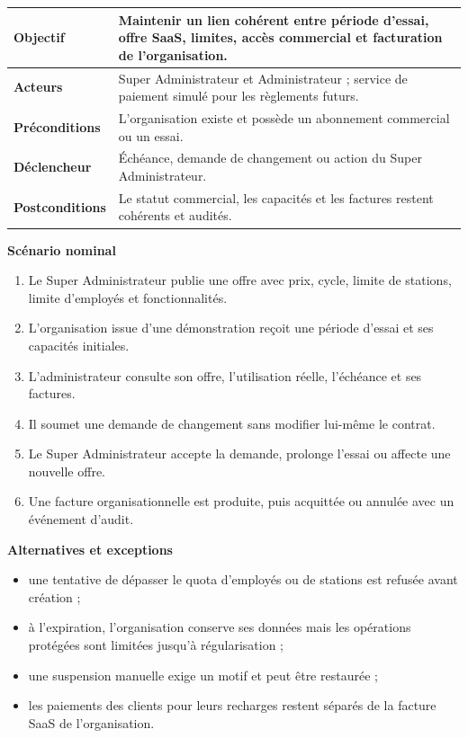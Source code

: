 \begin{table}[H]
  \centering
  \begin{tabularx}{\textwidth}{|C{3.3cm}|Y|}
    \hline
    \textbf{Objectif} & Maintenir un lien cohérent entre période d'essai, offre SaaS,
    limites, accès commercial et facturation de l'organisation.\\\hline
    \textbf{Acteurs} & Super Administrateur et Administrateur ; service de paiement
    simulé pour les règlements futurs.\\\hline
    \textbf{Préconditions} & L'organisation existe et possède un abonnement
    commercial ou un essai.\\\hline
    \textbf{Déclencheur} & Échéance, demande de changement ou action du Super
    Administrateur.\\\hline
    \textbf{Postconditions} & Le statut commercial, les capacités et les factures
    restent cohérents et audités.\\\hline

  \end{tabularx}
\end{table}

\textbf{Scénario nominal}
\begin{enumerate}[leftmargin=8mm]
  \item Le Super Administrateur publie une offre avec prix, cycle, limite de stations,
  limite d'employés et fonctionnalités.
  \item L'organisation issue d'une démonstration reçoit une période d'essai et ses
  capacités initiales.
  \item L'administrateur consulte son offre, l'utilisation réelle, l'échéance et ses
  factures.
  \item Il soumet une demande de changement sans modifier lui-même le contrat.
  \item Le Super Administrateur accepte la demande, prolonge l'essai ou affecte une
  nouvelle offre.
  \item Une facture organisationnelle est produite, puis acquittée ou annulée avec
  un événement d'audit.
\end{enumerate}

\textbf{Alternatives et exceptions}
\begin{itemize}[leftmargin=7mm]
  \item une tentative de dépasser le quota d'employés ou de stations est refusée avant
  création ;
  \item à l'expiration, l'organisation conserve ses données mais les opérations
  protégées sont limitées jusqu'à régularisation ;
  \item une suspension manuelle exige un motif et peut être restaurée ;
  \item les paiements des clients pour leurs recharges restent séparés de la facture
  SaaS de l'organisation.
\end{itemize}


